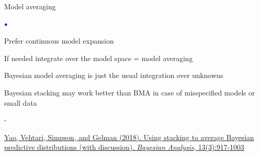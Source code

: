 \documentclass[english,t]{beamer}
\newenvironment{list1}{
   \begin{list}{$\color{list1}\bullet$}{\itemsep=6pt}}{
  \end{list}}
\newenvironment{list2}{
  \begin{list}{-}{\baselineskip=12pt\itemsep=2pt}}{
  \end{list}}
\begin{document}





\begin{frame}{Model averaging}
  
  \begin{list1}
  \item<+-> Prefer continuous model expansion
  \item<+-> If needed integrate over the model space = model averaging
  \item<+-> Bayesian model averaging is just the usual integration
    over unknowns
  \item<+-> Bayesian stacking may work better than BMA in case of
    misspecified models or small data
    \begin{list2}
    \item \href{https://projecteuclid.org/euclid.ba/1516093227}{Yao, Vehtari, Simpson, and Gelman (2018). Using stacking to average Bayesian predictive distributions (with discussion). \textit{Bayesian Analysis}, 13(3):917-1003}
    \end{list2}
  \end{list1}
  
\end{frame}
\end{document}
